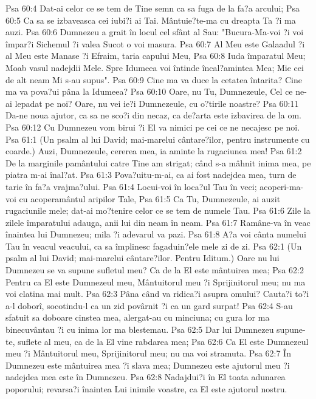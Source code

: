 Psa 60:4  Dat-ai celor ce se tem de Tine semn ca sa fuga de la fa?a arcului;
Psa 60:5  Ca sa se izbaveasca cei iubi?i ai Tai. Mântuie?te-ma cu dreapta Ta ?i ma auzi.
Psa 60:6  Dumnezeu a grait în locul cel sfânt al Sau: "Bucura-Ma-voi ?i voi împar?i Sichemul ?i valea Sucot o voi masura.
Psa 60:7  Al Meu este Galaadul ?i al Meu este Manase ?i Efraim, taria capului Meu,
Psa 60:8  Iuda împaratul Meu; Moab vasul nadejdii Mele. Spre Idumeea voi întinde încal?amintea Mea; Mie cei de alt neam Mi s-au supus".
Psa 60:9  Cine ma va duce la cetatea întarita? Cine ma va pova?ui pâna la Idumeea?
Psa 60:10  Oare, nu Tu, Dumnezeule, Cel ce ne-ai lepadat pe noi? Oare, nu vei ie?i Dumnezeule, cu o?tirile noastre?
Psa 60:11  Da-ne noua ajutor, ca sa ne sco?i din necaz, ca de?arta este izbavirea de la om.
Psa 60:12  Cu Dumnezeu vom birui ?i El va nimici pe cei ce ne necajesc pe noi.
Psa 61:1  (Un psalm al lui David; mai-marelui cântare?ilor, pentru instrumente cu coarde.) Auzi, Dumnezeule, cererea mea, ia aminte la rugaciunea mea!
Psa 61:2  De la marginile pamântului catre Tine am strigat; când s-a mâhnit inima mea, pe piatra m-ai înal?at.
Psa 61:3  Pova?uitu-m-ai, ca ai fost nadejdea mea, turn de tarie în fa?a vrajma?ului.
Psa 61:4  Locui-voi în loca?ul Tau în veci; acoperi-ma-voi cu acoperamântul aripilor Tale,
Psa 61:5  Ca Tu, Dumnezeule, ai auzit rugaciunile mele; dat-ai mo?tenire celor ce se tem de numele Tau.
Psa 61:6  Zile la zilele împaratului adauga, anii lui din neam în neam.
Psa 61:7  Ramâne-va în veac înaintea lui Dumnezeu; mila ?i adevarul va pazi.
Psa 61:8  A?a voi cânta numelui Tau în veacul veacului, ca sa împlinesc fagaduin?ele mele zi de zi.
Psa 62:1  (Un psalm al lui David; mai-marelui cântare?ilor. Pentru Iditum.) Oare nu lui Dumnezeu se va supune sufletul meu? Ca de la El este mântuirea mea;
Psa 62:2  Pentru ca El este Dumnezeul meu, Mântuitorul meu ?i Sprijinitorul meu; nu ma voi clatina mai mult.
Psa 62:3  Pâna când va ridica?i asupra omului? Cauta?i to?i a-l doborî, socotindu-l ca un zid povârnit ?i ca un gard surpat!
Psa 62:4  S-au sfatuit sa doboare cinstea mea, alergat-au cu minciuna; cu gura lor ma binecuvântau ?i cu inima lor ma blestemau.
Psa 62:5  Dar lui Dumnezeu supune-te, suflete al meu, ca de la El vine rabdarea mea;
Psa 62:6  Ca El este Dumnezeul meu ?i Mântuitorul meu, Sprijinitorul meu; nu ma voi stramuta.
Psa 62:7  În Dumnezeu este mântuirea mea ?i slava mea; Dumnezeu este ajutorul meu ?i nadejdea mea este în Dumnezeu.
Psa 62:8  Nadajdui?i în El toata adunarea poporului; revarsa?i înaintea Lui inimile voastre, ca El este ajutorul nostru.

